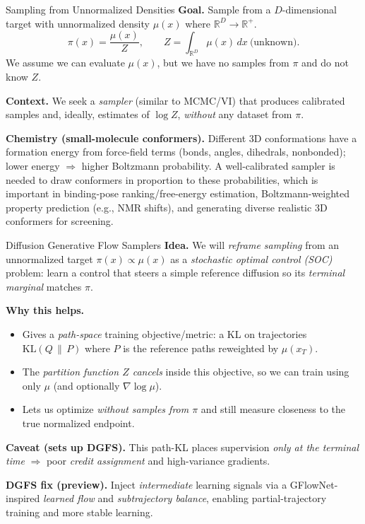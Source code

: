 \documentclass[aspectratio=169,xcolor=dvipsnames]{beamer}
\begin{document}
\begin{frame}[t]{Sampling from Unnormalized Densities}
\footnotesize
\textbf{Goal.} Sample from a $D$-dimensional target with unnormalized density $\mu(x)$ where $\mathbb R^D \to \mathbb R^+$.
\[
\pi(x)=\frac{\mu(x)}{Z},\qquad Z=\int_{\mathbb R^D}\mu(x)\,dx\ \text{(unknown)}.
\]
We assume we can evaluate $\mu(x)$, but we have no samples from $\pi$ and do not know $Z$.

\vspace{0.1cm}

\medskip
\textbf{Context.} We seek a \emph{sampler} (similar to MCMC/VI) that produces calibrated samples and, ideally, estimates of $\log Z$, \emph{without} any dataset from $\pi$.

\vspace{0.3cm}


\textbf{Chemistry (small-molecule conformers).} Different 3D conformations have a formation energy from force-field terms (bonds, angles, dihedrals, nonbonded); lower energy $\Rightarrow$ higher Boltzmann probability. A well-calibrated sampler is needed to draw conformers in proportion to these probabilities, which is important in binding-pose ranking/free-energy estimation, Boltzmann-weighted property prediction (e.g., NMR shifts), and generating diverse realistic 3D conformers for screening.
\end{frame}

\begin{frame}[t]{Diffusion Generative Flow Samplers}
\footnotesize
\textbf{Idea.} We will \emph{reframe sampling} from an unnormalized target $\pi(x)\propto \mu(x)$ as a \emph{stochastic optimal control (SOC)} problem: learn a control that steers a simple reference diffusion so its \emph{terminal marginal} matches $\pi$.

\medskip
\textbf{Why this helps.}
\begin{itemize}\itemsep2pt
  \item Gives a \emph{path-space} training objective/metric: a KL on trajectories $\mathrm{KL}(Q\,\|\,P)$ where $P$ is the reference paths reweighted by $\mu(x_T)$.
  \item The \emph{partition function $Z$ cancels} inside this objective, so we can train using only $\mu$ (and optionally $\nabla\log\mu$).
  \item Lets us optimize \emph{without samples from $\pi$} and still measure closeness to the true normalized endpoint.
\end{itemize}

\medskip
\textbf{Caveat (sets up DGFS).} This path-KL places supervision \emph{only at the terminal time} $\Rightarrow$ poor \emph{credit assignment} and high-variance gradients.

\medskip
\textbf{DGFS fix (preview).} Inject \emph{intermediate} learning signals via a GFlowNet-inspired \emph{learned flow} and \emph{subtrajectory balance}, enabling partial-trajectory training and more stable learning.
\end{frame}
\end{document}
